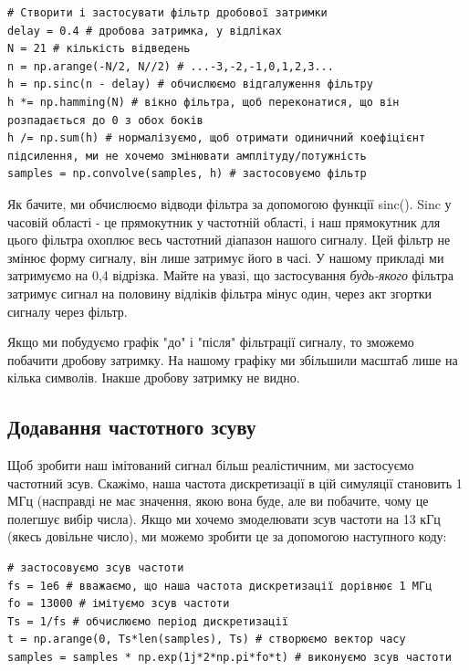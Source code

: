 \begin{Verbatim}[breaklines=true,breakanywhere=true,fontsize=\small]
# Створити і застосувати фільтр дробової затримки
delay = 0.4 # дробова затримка, у відліках
N = 21 # кількість відведень
n = np.arange(-N/2, N//2) # ...-3,-2,-1,0,1,2,3...
h = np.sinc(n - delay) # обчислюємо відгалуження фільтру
h *= np.hamming(N) # вікно фільтра, щоб переконатися, що він розпадається до 0 з обох боків
h /= np.sum(h) # нормалізуємо, щоб отримати одиничний коефіцієнт підсилення, ми не хочемо змінювати амплітуду/потужність
samples = np.convolve(samples, h) # застосовуємо фільтр
\end{Verbatim}

Як бачите, ми обчислюємо відводи фільтра за допомогою функції sinc().
Sinc у часовій області - це прямокутник у частотній області, і наш
прямокутник для цього фільтра охоплює весь частотний діапазон нашого
сигналу. Цей фільтр не змінює форму сигналу, він лише затримує його в
часі. У нашому прикладі ми затримуємо на 0,4 відрізка. Майте на увазі,
що застосування \emph{будь-якого} фільтра затримує сигнал на половину
відліків фільтра мінус один, через акт згортки сигналу через фільтр.

Якщо ми побудуємо графік "до" і "після" фільтрації сигналу, то зможемо
побачити дробову затримку. На нашому графіку ми збільшили масштаб лише
на кілька символів. Інакше дробову затримку не видно.

\href{../_images/fractional-delay-filter.svg}{}

\subsection{Додавання частотного
зсуву}\label{ux434ux43eux434ux430ux432ux430ux43dux43dux44f-ux447ux430ux441ux442ux43eux442ux43dux43eux433ux43e-ux437ux441ux443ux432ux443}

Щоб зробити наш імітований сигнал більш реалістичним, ми застосуємо
частотний зсув. Скажімо, наша частота дискретизації в цій симуляції
становить 1 МГц (насправді не має значення, якою вона буде, але ви
побачите, чому це полегшує вибір числа). Якщо ми хочемо змоделювати зсув
частоти на 13 кГц (якесь довільне число), ми можемо зробити це за
допомогою наступного коду:

\begin{Verbatim}[breaklines=true,breakanywhere=true,fontsize=\small]
# застосовуємо зсув частоти
fs = 1e6 # вважаємо, що наша частота дискретизації дорівнює 1 МГц
fo = 13000 # імітуємо зсув частоти
Ts = 1/fs # обчислюємо період дискретизації
t = np.arange(0, Ts*len(samples), Ts) # створюємо вектор часу
samples = samples * np.exp(1j*2*np.pi*fo*t) # виконуємо зсув частоти
\end{Verbatim}

